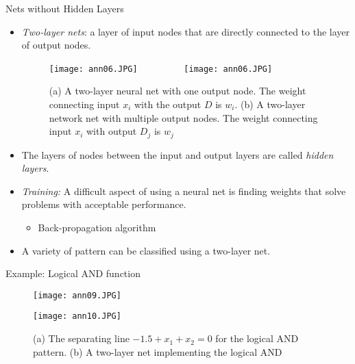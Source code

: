 

\begin{frame}{Nets without Hidden Layers}
\begin{itemize}
\item \textit{\color{slidecolor}Two-layer nets}: a layer of input nodes that are directly connected to the layer of output nodes.
\begin{figure}
\texttt{[image: ann06.JPG]}~~~~~~~~~
\texttt{[image: ann06.JPG]}
\caption{(a) A two-layer neural net with one output node. The weight connecting input $x_i$ with the output $D$ is $w_i$. (b) A two-layer network net with multiple output nodes. The weight connecting input $x_i$ with output $D_j$ is $w_j$}
\end{figure}
\item The layers of nodes between the input and output layers are called \textit{\color{slidecolor} hidden layers}.
\end{itemize}
\end{frame}

\begin{frame}{}
\begin{itemize}
\item \textit{\color{slidecolor}Training:} A difficult aspect of using a neural net is finding weights that solve problems with acceptable performance.
\begin{itemize}
\item Back-propagation algorithm
\end{itemize}
\item A variety of pattern can be classified using a two-layer net.
\end{itemize}
\end{frame}

\begin{frame}{Example: Logical AND function}
\begin{figure}
\texttt{[image: ann09.JPG]}
\end{figure}
\begin{figure}
\texttt{[image: ann10.JPG]}
\caption{(a) The separating line $-1.5+x_1+x_2=0$ for the logical AND pattern. (b) A two-layer net implementing the logical AND}
\end{figure}
\end{frame}

